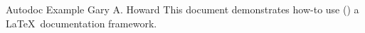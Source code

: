 \documentclass[10pt]{tlc-article}%
\begin{document}
%
  \tlcTitlePageAndTableOfContents%
    {Autodoc Example}%
    {Gary A. Howard}%
    {This document demonstrates how-to use (\adAutoDoc) a \LaTeX\ documentation
     framework.}%











\printGlossaries%

\end{document}
